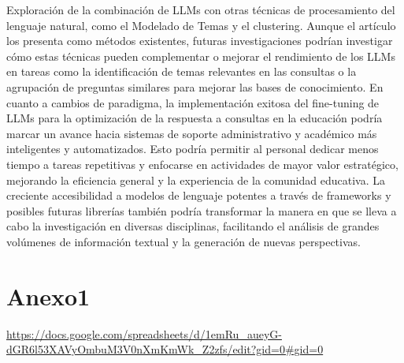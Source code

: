 \documentclass[12pt,twocolumn]{article}
\begin{document}
Exploración de la combinación de LLMs con otras técnicas de procesamiento del lenguaje natural, como el Modelado de Temas y el clustering. Aunque el artículo los presenta como métodos existentes, futuras investigaciones podrían investigar cómo estas técnicas pueden complementar o mejorar el rendimiento de los LLMs en tareas como la identificación de temas relevantes en las consultas o la agrupación de preguntas similares para mejorar las bases de conocimiento.
En cuanto a cambios de paradigma, la implementación exitosa del fine-tuning de LLMs para la optimización de la respuesta a consultas en la educación podría marcar un avance hacia sistemas de soporte administrativo y académico más inteligentes y automatizados. Esto podría permitir al personal dedicar menos tiempo a tareas repetitivas y enfocarse en actividades de mayor valor estratégico, mejorando la eficiencia general y la experiencia de la comunidad educativa. 
La creciente accesibilidad a modelos de lenguaje potentes a través de frameworks y posibles futuras librerías también podría transformar la manera en que se lleva a cabo la investigación en diversas disciplinas, facilitando el análisis de grandes volúmenes de información textual y la generación de nuevas perspectivas.
\section{Anexo1}
\url{https://docs.google.com/spreadsheets/d/1emRu_aueyG-dGR6l53XAVyOmbuM3V0nXmKmWk_Z2zfs/edit?gid=0#gid=0}
%
\printbibliography
%
\end{document}

